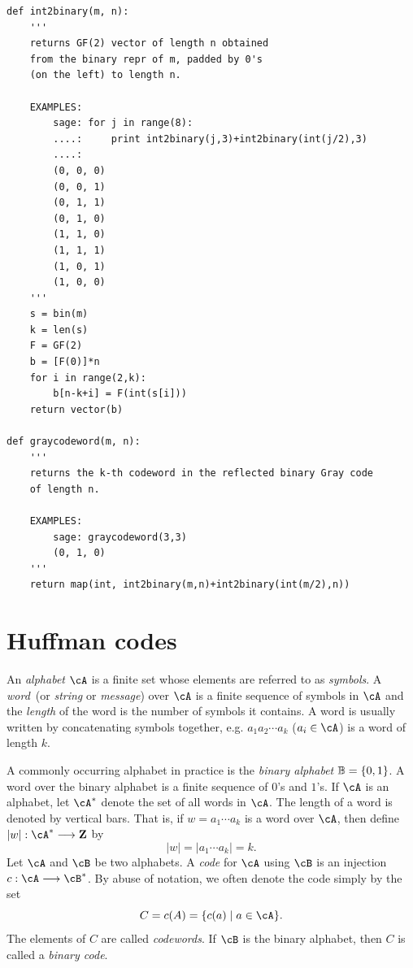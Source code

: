 \begin{lstlisting}
def int2binary(m, n):
    '''
    returns GF(2) vector of length n obtained
    from the binary repr of m, padded by 0's
    (on the left) to length n.

    EXAMPLES:
        sage: for j in range(8):
        ....:     print int2binary(j,3)+int2binary(int(j/2),3)
        ....:
        (0, 0, 0)
        (0, 0, 1)
        (0, 1, 1)
        (0, 1, 0)
        (1, 1, 0)
        (1, 1, 1)
        (1, 0, 1)
        (1, 0, 0)
    '''
    s = bin(m)
    k = len(s)
    F = GF(2)
    b = [F(0)]*n
    for i in range(2,k):
        b[n-k+i] = F(int(s[i]))
    return vector(b)

def graycodeword(m, n):
    '''
    returns the k-th codeword in the reflected binary Gray code
    of length n.

    EXAMPLES:
        sage: graycodeword(3,3)
        (0, 1, 0)
    '''
    return map(int, int2binary(m,n)+int2binary(int(m/2),n))
\end{lstlisting}



\section{Huffman codes}
\label{sec:trees_forests:Huffman_codes}

An \emph{alphabet} $\cA$ is a finite set whose
elements are referred to as \emph{symbols}. A
\emph{word}~(or \emph{string} or
\emph{message}) over $\cA$ is a finite sequence of
symbols in $\cA$ and the \emph{length} of the word is the number of
symbols it contains. A word is usually written by concatenating
symbols together, e.g. $a_1 a_2 \cdots a_k$ ($a_i \in \cA$) is a word
of length $k$.

A commonly occurring alphabet in practice is the
\emph{binary alphabet} $\mathbb{B} = \{0, 1\}$. A word
over the binary alphabet is a finite sequence of $0$'s and
$1$'s. If $\cA$ is an alphabet, let $\cA^*$ denote the set of all
words in $\cA$. The length of a word is denoted by vertical bars. That
is, if $w = a_1 \cdots a_k$ is a word over $\cA$, then define
$|w|: \cA^* \to \Z$ by
\[
|w|
=
|a_1 \cdots a_k|
=
k.
\]
Let $\cA$ and $\cB$ be two alphabets. A \emph{code} for
$\cA$ using $\cB$ is an injection $c: \cA \to \cB^*$. By abuse of
notation, we often denote the code simply by the set
\[
C
=
c(A)
=
\{c(a) \mid a \in \cA\}.
\]
The elements of $C$ are called \emph{codewords}. If
$\cB$ is the binary alphabet, then $C$ is called a
\emph{binary code}.


